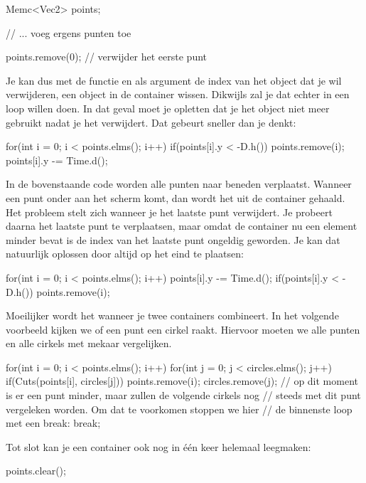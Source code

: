 \begin{code}
Memc<Vec2> points;

// ... voeg ergens punten toe

points.remove(0); // verwijder het eerste punt
\end{code}

Je kan dus met de functie  en als argument de index van het object dat je wil verwijderen, een object in de container wissen. Dikwijls zal je dat echter in een loop willen doen. In dat geval moet je opletten dat je het object niet meer gebruikt nadat je het verwijdert. Dat gebeurt sneller dan je denkt:

\begin{code}
for(int i = 0; i < points.elms(); i++) {
  if(points[i].y < -D.h()) points.remove(i);
	points[i].y -= Time.d();
}
\end{code}

In de bovenstaande code worden alle punten naar beneden verplaatst. Wanneer een punt onder aan het scherm komt, dan wordt het uit de container gehaald. Het probleem stelt zich wanneer je het laatste punt verwijdert. Je probeert daarna het laatste punt te verplaatsen, maar omdat de container nu een element minder bevat is de index van het laatste punt ongeldig geworden. Je kan dat natuurlijk oplossen door  altijd op het eind te plaatsen:

\begin{code}
for(int i = 0; i < points.elms(); i++) {
	points[i].y -= Time.d();
  if(points[i].y < -D.h()) points.remove(i);
}
\end{code}

Moeilijker wordt het wanneer je twee containers combineert. In het volgende voorbeeld kijken we of een punt een cirkel raakt. Hiervoor moeten we alle punten en alle cirkels met mekaar vergelijken.

\begin{code}
for(int i = 0; i < points.elms(); i++) {
	for(int j = 0; j < circles.elms(); j++) {
	  if(Cuts(points[i], circles[j])) {
		  points.remove(i);
		  circles.remove(j);
		  // op dit moment is er een punt minder, maar zullen de volgende cirkels nog 
		  // steeds met dit punt vergeleken worden. Om dat te voorkomen stoppen we hier 
			// de binnenste loop met een break:
			break;
		}		
	}
}
\end{code}

Tot slot kan je een container ook nog in \'e\'en keer helemaal leegmaken:

\begin{code}
points.clear();
\end{code}

